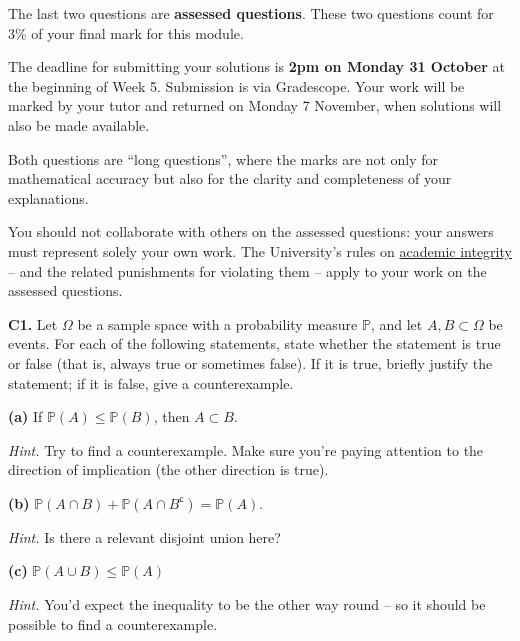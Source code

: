 \documentclass[
  a4paper,
]{book}
\theoremstyle{definition}
\theoremstyle{definition}
\theoremstyle{definition}
\theoremstyle{definition}
\theoremstyle{remark}
\begin{document}
The last two questions are \textbf{assessed questions}. These two questions count for 3\% of your final mark for this module.

The deadline for submitting your solutions is \textbf{2pm on Monday 31 October} at the beginning of Week 5. Submission is via Gradescope.
Your work will be marked by your tutor and returned on Monday 7 November, when solutions will also be made available.

Both questions are ``long questions'', where the marks are not only for mathematical accuracy but also for the clarity and completeness of your explanations.

You should not collaborate with others on the assessed questions: your answers must represent solely your own work. The University's rules on \href{https://library.leeds.ac.uk/info/1401/academic_skills/46/academic_integrity_and_plagiarism}{academic integrity} -- and the related punishments for violating them -- apply to your work on the assessed questions.

\textbf{C1.} Let \(\Omega\) be a sample space with a probability measure \(\mathbb P\), and let \(A, B \subset \Omega\) be events. For each of the following statements, state whether the statement is true or false (that is, always true or sometimes false). If it is true, briefly justify the statement; if it is false, give a counterexample.

\textbf{(a)} If \(\mathbb P(A) \leq \mathbb P(B)\), then \(A \subset B\).

\begin{myanswers}
\emph{Hint.} Try to find a counterexample. Make sure you're paying attention to the direction of implication (the other direction is true).


\end{myanswers}

\textbf{(b)} \(\mathbb P(A \cap B) + \mathbb P(A \cap B^{\mathsf{c}}) = \mathbb P(A)\).

\begin{myanswers}
\emph{Hint.} Is there a relevant disjoint union here?


\end{myanswers}

\textbf{(c)} \(\mathbb P(A \cup B) \leq \mathbb P(A)\)

\begin{myanswers}
\emph{Hint.} You'd expect the inequality to be the other way round -- so it should be possible to find a counterexample.

\end{myanswers}
\end{document}
